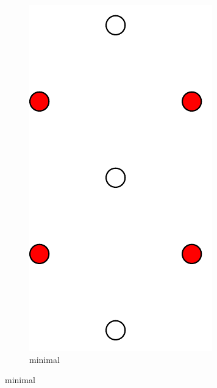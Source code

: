 \begin{figure}[ht]
  \centering
  \begin{subfigure}{0.25\textwidth}
    \centering
    \includegraphics[width=\textwidth]{img/example_minimal_vertex_cover.pdf}
    \caption{minimal}
  \end{subfigure}
  \hspace{2em}
  \VRule

\end{figure}
